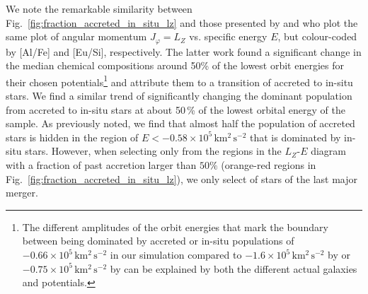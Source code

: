 \documentclass[fleqn,usenatbib]{mnras}
\begin{document}
We note the remarkable similarity between Fig.~\ref{fig:fraction_accreted_in_situ_lz} and those presented by \citet[][their Fig.~1]{Belokurov2022} and \citet[][their Fig.~1]{Monty2024} who plot the same plot of angular momentum $J_\varphi = L_Z$ vs. specific energy $E$, but colour-coded by [Al/Fe] and [Eu/Si], respectively. The latter work found a significant change in the median chemical compositions around 50\% of the lowest orbit energies for their chosen potentials\footnote{The different amplitudes of the orbit energies that mark the boundary between being dominated by accreted or in-situ populations of $-0.66 \times 10^5\,\mathrm{km^2\,s^{-2}}$ in our simulation compared to $-1.6 \times 10^5\,\mathrm{km^2\,s^{-2}}$ by \citet{Monty2024} or $-0.75 \times 10^5\,\mathrm{km^2\,s^{-2}}$ by \citet{Belokurov2022} can be explained by both the different actual galaxies and potentials.} and attribute them to a transition of accreted to in-situ stars. We find a similar trend of significantly changing the dominant population from accreted to in-situ stars at about 50\,\% of the lowest orbital energy of the sample. As previously noted, we find that almost half the population of accreted stars is hidden in the region of $E < -0.58\times10^5\,\mathrm{km^2\,s^{-2}}$ that is dominated by in-situ stars. However, when selecting only from the regions in the $L_Z$-$E$ diagram with a fraction of past accretion larger than $50\mathrm{\%}$ (orange-red regions in Fig.~\ref{fig:fraction_accreted_in_situ_lz}), we only select  of stars of the last major merger.
\end{document}
